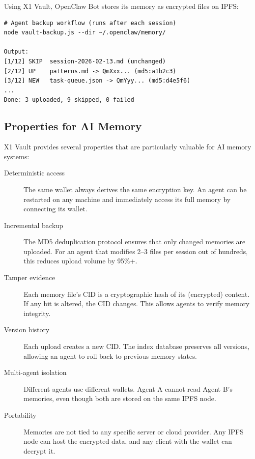 \documentclass[11pt,a4paper]{article}
\begin{document}
Using X1 Vault, OpenClaw Bot stores its memory as encrypted files on IPFS:

\begin{verbatim}
# Agent backup workflow (runs after each session)
node vault-backup.js --dir ~/.openclaw/memory/

Output:
[1/12] SKIP  session-2026-02-13.md (unchanged)
[2/12] UP    patterns.md -> QmXxx... (md5:a1b2c3)
[3/12] NEW   task-queue.json -> QmYyy... (md5:d4e5f6)
...
Done: 3 uploaded, 9 skipped, 0 failed
\end{verbatim}

\subsection{Properties for AI Memory}

X1 Vault provides several properties that are particularly valuable for AI memory systems:

\begin{description}
    \item[Deterministic access] The same wallet always derives the same encryption key. An agent can be restarted on any machine and immediately access its full memory by connecting its wallet.

    \item[Incremental backup] The MD5 deduplication protocol ensures that only changed memories are uploaded. For an agent that modifies 2--3 files per session out of hundreds, this reduces upload volume by 95\%+.

    \item[Tamper evidence] Each memory file's CID is a cryptographic hash of its (encrypted) content. If any bit is altered, the CID changes. This allows agents to verify memory integrity.

    \item[Version history] Each upload creates a new CID. The index database preserves all versions, allowing an agent to roll back to previous memory states.

    \item[Multi-agent isolation] Different agents use different wallets. Agent A cannot read Agent B's memories, even though both are stored on the same IPFS node.

    \item[Portability] Memories are not tied to any specific server or cloud provider. Any IPFS node can host the encrypted data, and any client with the wallet can decrypt it.
\end{description}
\end{document}
